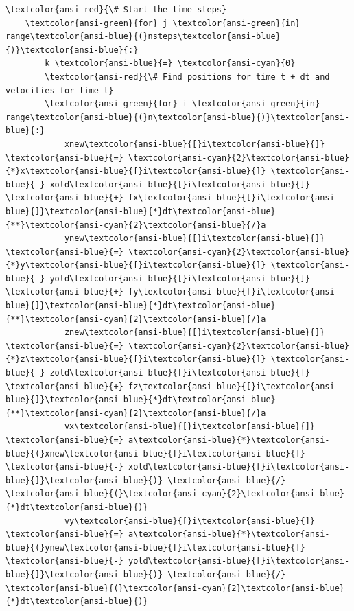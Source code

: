 \documentclass[11pt]{article}
\begin{document}
\begin{Verbatim}[commandchars=\\\{\}]
    \textcolor{ansi-red}{\# Start the time steps}
    \textcolor{ansi-green}{for} j \textcolor{ansi-green}{in} range\textcolor{ansi-blue}{(}nsteps\textcolor{ansi-blue}{)}\textcolor{ansi-blue}{:}
        k \textcolor{ansi-blue}{=} \textcolor{ansi-cyan}{0}
        \textcolor{ansi-red}{\# Find positions for time t + dt and velocities for time t}
        \textcolor{ansi-green}{for} i \textcolor{ansi-green}{in} range\textcolor{ansi-blue}{(}n\textcolor{ansi-blue}{)}\textcolor{ansi-blue}{:}
            xnew\textcolor{ansi-blue}{[}i\textcolor{ansi-blue}{]} \textcolor{ansi-blue}{=} \textcolor{ansi-cyan}{2}\textcolor{ansi-blue}{*}x\textcolor{ansi-blue}{[}i\textcolor{ansi-blue}{]} \textcolor{ansi-blue}{-} xold\textcolor{ansi-blue}{[}i\textcolor{ansi-blue}{]} \textcolor{ansi-blue}{+} fx\textcolor{ansi-blue}{[}i\textcolor{ansi-blue}{]}\textcolor{ansi-blue}{*}dt\textcolor{ansi-blue}{**}\textcolor{ansi-cyan}{2}\textcolor{ansi-blue}{/}a
            ynew\textcolor{ansi-blue}{[}i\textcolor{ansi-blue}{]} \textcolor{ansi-blue}{=} \textcolor{ansi-cyan}{2}\textcolor{ansi-blue}{*}y\textcolor{ansi-blue}{[}i\textcolor{ansi-blue}{]} \textcolor{ansi-blue}{-} yold\textcolor{ansi-blue}{[}i\textcolor{ansi-blue}{]} \textcolor{ansi-blue}{+} fy\textcolor{ansi-blue}{[}i\textcolor{ansi-blue}{]}\textcolor{ansi-blue}{*}dt\textcolor{ansi-blue}{**}\textcolor{ansi-cyan}{2}\textcolor{ansi-blue}{/}a
            znew\textcolor{ansi-blue}{[}i\textcolor{ansi-blue}{]} \textcolor{ansi-blue}{=} \textcolor{ansi-cyan}{2}\textcolor{ansi-blue}{*}z\textcolor{ansi-blue}{[}i\textcolor{ansi-blue}{]} \textcolor{ansi-blue}{-} zold\textcolor{ansi-blue}{[}i\textcolor{ansi-blue}{]} \textcolor{ansi-blue}{+} fz\textcolor{ansi-blue}{[}i\textcolor{ansi-blue}{]}\textcolor{ansi-blue}{*}dt\textcolor{ansi-blue}{**}\textcolor{ansi-cyan}{2}\textcolor{ansi-blue}{/}a
            vx\textcolor{ansi-blue}{[}i\textcolor{ansi-blue}{]} \textcolor{ansi-blue}{=} a\textcolor{ansi-blue}{*}\textcolor{ansi-blue}{(}xnew\textcolor{ansi-blue}{[}i\textcolor{ansi-blue}{]} \textcolor{ansi-blue}{-} xold\textcolor{ansi-blue}{[}i\textcolor{ansi-blue}{]}\textcolor{ansi-blue}{)} \textcolor{ansi-blue}{/} \textcolor{ansi-blue}{(}\textcolor{ansi-cyan}{2}\textcolor{ansi-blue}{*}dt\textcolor{ansi-blue}{)}
            vy\textcolor{ansi-blue}{[}i\textcolor{ansi-blue}{]} \textcolor{ansi-blue}{=} a\textcolor{ansi-blue}{*}\textcolor{ansi-blue}{(}ynew\textcolor{ansi-blue}{[}i\textcolor{ansi-blue}{]} \textcolor{ansi-blue}{-} yold\textcolor{ansi-blue}{[}i\textcolor{ansi-blue}{]}\textcolor{ansi-blue}{)} \textcolor{ansi-blue}{/} \textcolor{ansi-blue}{(}\textcolor{ansi-cyan}{2}\textcolor{ansi-blue}{*}dt\textcolor{ansi-blue}{)}

\end{Verbatim}
\end{document}
